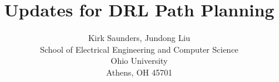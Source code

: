 \title{Updates for DRL Path Planning}
\author{Kirk Saunders, Jundong Liu \\
        School of Electrical Engineering and Computer Science \\
        Ohio University \\
        Athens, OH 45701}
\date{}

\maketitle